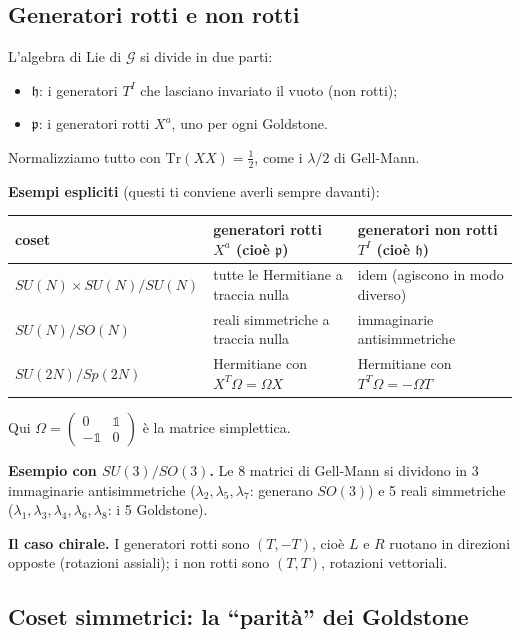 \documentclass[11pt,a4paper]{article}
\numberwithin{equation}{section}
\theoremstyle{remark}
\newcommand{\Tr}{\mathrm{Tr}}
\newcommand{\G}{\mathcal{G}}
\newcommand{\p}{\mathfrak{p}}
\newcommand{\h}{\mathfrak{h}}
\newcommand{\one}{\mathbb{1}}
\begin{document}
\subsection{Generatori rotti e non rotti}

L'algebra di Lie di $\G$ si divide in due parti:
\begin{itemize}[nosep]
\item $\h$: i generatori $T^I$ che lasciano invariato il vuoto (non rotti);
\item $\p$: i generatori rotti $X^a$, uno per ogni Goldstone.
\end{itemize}
Normalizziamo tutto con $\Tr(XX)=\frac12$, come i $\lambda/2$ di Gell-Mann.

\textbf{Esempi espliciti} (questi ti conviene averli sempre davanti):
\begin{center}
\begin{tabular}{p{}p{}p{}}
\hline
coset & generatori rotti $X^a$ (cioè $\p$) & generatori non rotti $T^I$ (cioè $\h$)\\
\hline
$SU(N)\times SU(N)/SU(N)$ & tutte le Hermitiane a traccia nulla & idem (agiscono in modo diverso)\\
$SU(N)/SO(N)$ & reali simmetriche a traccia nulla & immaginarie antisimmetriche\\
$SU(2N)/Sp(2N)$ & Hermitiane con $X^T\Omega=\Omega X$ & Hermitiane con $T^T\Omega=-\Omega T$\\
\hline
\end{tabular}
\end{center}
Qui $\Omega=\begin{pmatrix}0&\one\\-\one&0\end{pmatrix}$ è la matrice simplettica.

\textbf{Esempio con $SU(3)/SO(3)$.} Le 8 matrici di Gell-Mann si dividono in 3 immaginarie antisimmetriche ($\lambda_2,\lambda_5,\lambda_7$: generano $SO(3)$) e 5 reali simmetriche ($\lambda_1,\lambda_3,\lambda_4,\lambda_6,\lambda_8$: i 5 Goldstone).

\textbf{Il caso chirale.} I generatori rotti sono $(T,-T)$, cioè $L$ e $R$ ruotano in direzioni opposte (rotazioni assiali); i non rotti sono $(T,T)$, rotazioni vettoriali.

\subsection{Coset simmetrici: la ``parità'' dei Goldstone}
\end{document}
